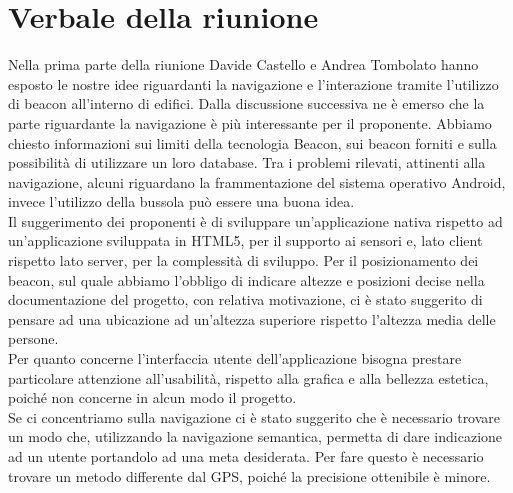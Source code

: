 \documentclass[../Riunione2015-12-21.tex]{subfiles}
\begin{document}
\section{Verbale della riunione}
Nella prima parte della riunione Davide Castello e Andrea Tombolato hanno esposto le nostre idee riguardanti la navigazione e l'interazione tramite l'utilizzo di beacon all'interno di edifici. Dalla discussione successiva ne è emerso che la parte riguardante la navigazione è più interessante per il proponente. Abbiamo chiesto informazioni sui limiti della tecnologia Beacon, sui beacon forniti e sulla possibilità di utilizzare un loro database. 
Tra i problemi rilevati, attinenti alla navigazione, alcuni riguardano la frammentazione del sistema operativo Android, invece l'utilizzo della bussola può essere una buona idea. \\ Il suggerimento dei proponenti è di sviluppare un'applicazione nativa rispetto ad un'applicazione sviluppata in HTML5, per il supporto ai sensori e, lato client rispetto lato server, per la complessità di sviluppo.
Per il posizionamento dei beacon, sul quale abbiamo l'obbligo di indicare altezze e posizioni decise nella documentazione del progetto, con relativa motivazione, ci è stato suggerito di pensare ad una ubicazione ad un'altezza superiore rispetto l'altezza media delle persone. \\
Per quanto concerne l'interfaccia utente dell'applicazione bisogna prestare particolare attenzione all'usabilità, rispetto alla grafica e alla bellezza estetica, poiché non concerne in alcun modo il progetto. \\
Se ci concentriamo sulla navigazione ci è stato suggerito che è necessario trovare un modo che, utilizzando la navigazione semantica, permetta di dare indicazione ad un utente portandolo ad una meta desiderata. Per fare questo è necessario trovare un metodo differente dal GPS, poiché la precisione ottenibile è minore.
\end{document}
